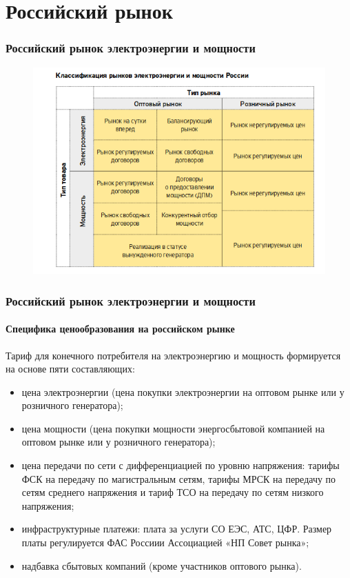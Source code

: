 \documentclass[c, dvipsnames]{beamer}  %
\begin{document}
\section{Российский рынок}




\begin{frame}[shrink=5]



\frametitle{Российский рынок электроэнергии и мощности} 



\begin{figure}
	\centering
	\includegraphics[width=0.8\linewidth]{screenshot004}
	\label{fig:screenshot004}
\end{figure}


\end{frame}



\begin{frame}[shrink=5]
\frametitle{Российский рынок электроэнергии и мощности} 
\framesubtitle{Специфика ценообразования на российском рынке} 

Тариф для конечного потребителя на электроэнергию и мощность формируется на основе пяти составляющих:
\begin{itemize}
	\item 
	цена электроэнергии (цена покупки электроэнергии на оптовом рынке или у розничного генератора);
	\item  цена мощности (цена покупки мощности энергосбытовой компанией на оптовом рынке или у розничного генератора);
	\item  цена передачи по сети с дифференциацией по уровню напряжения: тарифы ФСК на передачу по магистральным сетям, тарифы МРСК на передачу по сетям среднего напряжения и тариф ТСО на передачу по сетям низкого напряжения;
	\item  инфраструктурные платежи: плата за услуги СО ЕЭС, АТС, ЦФР. Размер платы регулируется ФАС Россиии Ассоциацией «НП Совет рынка»;
	\item   надбавка сбытовых компаний  (кроме участников оптового рынка).
	
\end{itemize}
\end{frame}
\end{document}
